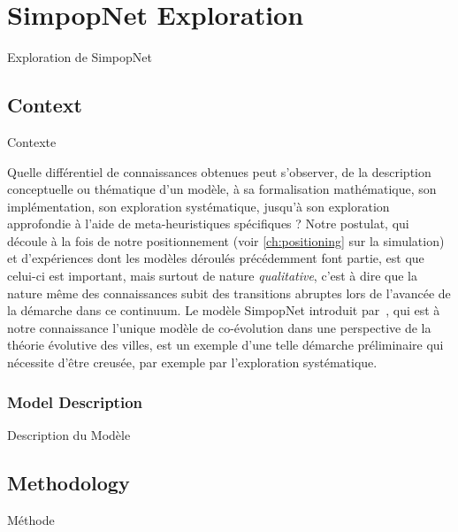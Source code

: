 




\newpage


\section[SimpopNet Exploration][Exploration de SimpopNet]{SimpopNet Exploration}{Exploration de SimpopNet}


 

\subsection{Context}{Contexte}

Quelle différentiel de connaissances obtenues peut s'observer, de la description conceptuelle ou thématique d'un modèle, à sa formalisation mathématique, son implémentation, son exploration systématique, jusqu'à son exploration approfondie à l'aide de meta-heuristiques spécifiques ? Notre postulat, qui découle à la fois de notre positionnement (voir \autoref{ch:positioning} sur la simulation) et d'expériences dont les modèles déroulés précédemment font partie, est que celui-ci est important, mais surtout de nature \emph{qualitative}, c'est à dire que la nature même des connaissances subit des transitions abruptes lors de l'avancée de la démarche dans ce continuum. Le modèle SimpopNet introduit par~\cite{schmitt2014modelisation}, qui est à notre connaissance l'unique modèle de co-évolution dans une perspective de la théorie évolutive des villes, est un exemple d'une telle démarche préliminaire qui nécessite d'être creusée, par exemple par l'exploration systématique.


\subsubsection{Model Description}{Description du Modèle}




\subsection{Methodology}{Méthode}

